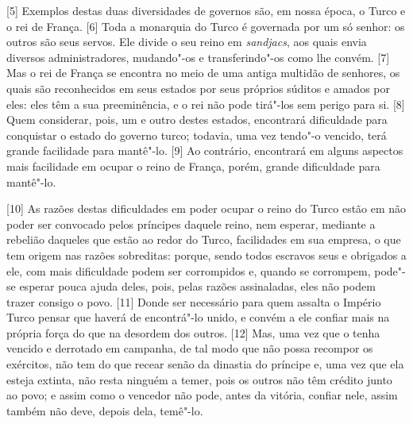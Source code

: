 {[}5{]} Exemplos destas duas diversidades de governos são, em nossa
época, o Turco e o
rei de França. {[}6{]} Toda a monarquia do Turco é governada por um só
senhor: os outros são seus servos. Ele divide o seu reino em
\emph{sandjacs}, aos quais envia diversos
administradores, mudando"-os e transferindo"-os como lhe convém. {[}7{]}
Mas o rei de França se encontra no meio de uma antiga multidão de
senhores, os quais são reconhecidos em seus estados por seus próprios
súditos e amados por eles: eles têm a sua preeminência, e o rei não pode
tirá"-los sem perigo para si. {[}8{]} Quem considerar, pois, um e outro
destes estados, encontrará dificuldade para conquistar o estado do
governo turco; todavia, uma vez tendo"-o vencido, terá grande facilidade
para mantê"-lo. {[}9{]} Ao contrário, encontrará em alguns aspectos mais
facilidade em ocupar o reino de França, porém, grande dificuldade para
mantê"-lo.

{[}10{]} As razões destas dificuldades em poder ocupar o reino do Turco
estão em não poder ser convocado pelos príncipes daquele reino, nem esperar, mediante a
rebelião daqueles que estão ao redor do Turco, facilidades em sua
empresa, o que tem origem nas razões sobreditas: porque, sendo todos
escravos seus e obrigados a ele, com mais dificuldade podem ser
corrompidos e, quando se corrompem, pode"-se esperar pouca ajuda deles,
pois, pelas razões assinaladas, eles não podem trazer consigo o povo.
{[}11{]} Donde ser necessário para quem assalta o Império Turco pensar
que haverá de encontrá"-lo unido, e convém a ele confiar mais na própria
força do que na desordem dos outros. {[}12{]} Mas, uma vez que o tenha
vencido e derrotado em campanha, de tal modo que não possa recompor os
exércitos, não tem do que recear senão da dinastia do príncipe e, uma
vez que ela esteja extinta, não resta ninguém a temer, pois os outros
não têm crédito junto ao povo; e assim como o vencedor não pode, antes
da vitória, confiar nele, assim também não deve, depois dela, temê"-lo.

